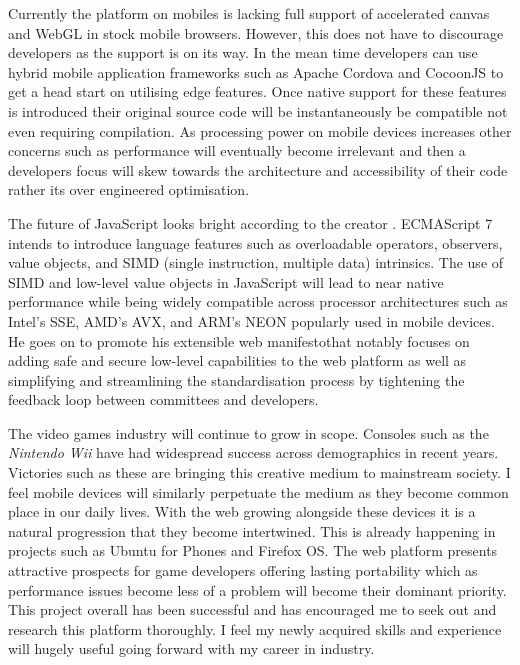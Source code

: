 \documentclass[final]{cmpreport}
\begin{document}
Currently the platform on mobiles is lacking full support of accelerated canvas and WebGL in stock mobile browsers. However, this does not have to discourage developers as the support is on its way. In the mean time developers can use hybrid mobile application frameworks such as Apache Cordova and CocoonJS to get a head start on utilising edge features. Once native support for these features is introduced their original source code will be instantaneously be compatible not even requiring compilation. As processing power on mobile devices increases other concerns such as performance will eventually become irrelevant and then a developers focus will skew towards the architecture and accessibility of their code rather its over engineered optimisation.

The future of JavaScript looks bright according to the creator \citet{Eich}. ECMAScript 7 intends to introduce language features such as overloadable operators, observers, value objects, and SIMD (single instruction, multiple data) intrinsics. The use of SIMD and low-level value objects in JavaScript will lead to near native performance while being widely compatible across processor architectures such as Intel's SSE, AMD's AVX, and ARM's NEON popularly used in mobile devices. He goes on to promote his extensible web manifesto\footnotemark that notably focuses on adding safe and secure low-level capabilities to the web platform as well as simplifying and streamlining the standardisation process by tightening the feedback loop between committees and developers.


The video games industry will continue to grow in scope. Consoles such as the \textit{Nintendo Wii} have had widespread success across demographics in recent years. Victories such as these are bringing this creative medium to mainstream society. I feel mobile devices will similarly perpetuate the medium as they become common place in our daily lives. With the web growing alongside these devices it is a natural progression that they become intertwined. This is already happening in projects such as Ubuntu for Phones and Firefox OS. The web platform presents attractive prospects for game developers offering lasting portability which as performance issues become less of a problem will become their dominant priority. This project overall has been successful and has encouraged me to seek out and research this platform thoroughly. I feel my newly acquired skills and experience will hugely useful going forward with my career in industry.
\end{document}
